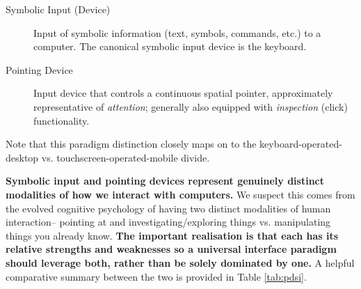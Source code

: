 \documentclass[logo,bsc,singlespacing,parskip]{infthesis}
\begin{document}
\begin{mdframed}
\begin{description}
\item[{Symbolic Input (Device)\label{symbolic input}}] Input of symbolic information (text, symbols, commands, etc.) to a computer.
The canonical symbolic input device is the keyboard.
\end{description}
\end{mdframed}

\begin{mdframed}
\begin{description}
\item[{Pointing Device\label{pointing device}}] Input device that controls a continuous spatial pointer, approximately representative of \emph{attention}; generally also equipped with \emph{inspection} (click) functionality.
\end{description}
\end{mdframed}

Note that this paradigm distinction closely maps on to the keyboard-operated-desktop vs. touchscreen-operated-mobile divide.

\textbf{Symbolic input and pointing devices represent genuinely distinct modalities of how we interact with computers.}
We suspect this comes from the evolved cognitive psychology of having two distinct modalities of human interaction-- pointing at and investigating/exploring things vs. manipulating things you already know.
\textbf{The important realisation is that each has its relative strengths and weaknesses so a universal interface paradigm should leverage both, rather than be solely dominated by one.}
A helpful comparative summary between the two is provided in Table \ref{tab:pdsi}.
\end{document}
